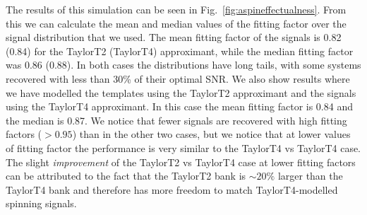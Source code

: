The results of this simulation can be seen in 
Fig.~\ref{fig:aspineffectualness}. From this we can calculate the mean and 
median values of the fitting factor over the signal distribution that we used.
The mean fitting factor of the
signals is 0.82 (0.84) for the TaylorT2 (TaylorT4) approximant, while the median
fitting factor was 0.86 (0.88). In both cases the distributions have 
long tails, with some systems recovered with less than 30\% of their optimal
\ac{SNR}.
We also show results where we have modelled the templates using the TaylorT2
approximant and the signals using the TaylorT4 approximant. In this case
the mean fitting factor is 0.84 and the median is 0.87.
We notice that fewer signals are recovered with
high fitting factors ($> 0.95$) than in the other two cases, but we notice that
at lower values of fitting
factor the performance is very similar to the TaylorT4 vs TaylorT4 case.
The slight \emph{improvement}
of the TaylorT2 vs TaylorT4 case at lower fitting factors can be attributed to
the fact that the TaylorT2 bank is $\sim20\%$
larger than the TaylorT4 bank and therefore has more freedom to match
TaylorT4-modelled spinning signals. 

